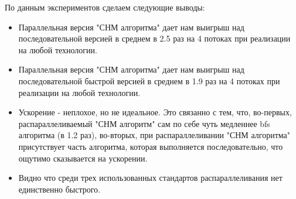 \documentclass{report}
\begin{document}

\par По данным экспериментов сделаем следующие выводы:
\begin{itemize}
    \item Параллельная версия "СНМ алгоритма" дает нам выигрыш над последовательной версией в среднем в 2.5 раз на 4 потоках при реализации на любой технологии.
    \item Параллельная версия "СНМ алгоритма" дает нам выигрыш над последовательной быстрой версией в среднем в 1.9 раз на 4 потоках при реализации на любой технологии.
    \item Ускорение - неплохое, но не идеальное. Это связанно с тем, что, во-первых, распараллеливаемый "СНМ алгоритм" сам по себе чуть медленнее bfs алгоритма (в 1.2 раз), во-вторых, при распараллеливании "СНМ алгоритма" присутствует часть алгоритма, которая выполняется последовательно, что ощутимо сказывается на ускорении.
    \item Видно что среди трех использованных стандартов распараллеливания нет единственно быстрого.
\end{itemize}
\end{document}
